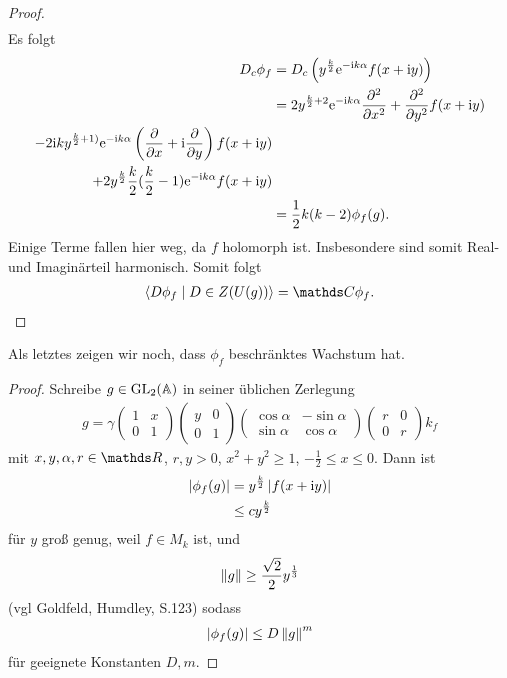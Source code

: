 \begin{proof}
\begin{align*}
\end{align*}
Es folgt
\begin{align*}
D_c \phi_f&=D_c\left(y^{\frac{k}{2}} \mathrm{e}^{-\mathrm{i}k\alpha} f(x+\mathrm{i}y)\right)\\
&=2y^{\frac{k}{2}+2} \mathrm{e}^{-\mathrm{i}k\alpha} \frac{\partial^2}{\partial x^2}+ \frac{\partial^2}{\partial y^2} f(x+\mathrm{i}y)\\
-2\mathrm{i}k y^{\frac{k}{2}+1)} \mathrm{e}^{-\mathrm{i}k\alpha} \left(\frac{\partial}{\partial x}+\mathrm{i}\frac{\partial}{\partial y}\right) f(x+\mathrm{i}y)\\
+2y^{\frac{k}{2}} \frac{k}{2}(\frac{k}{2}-1)\mathrm{e}^{-\mathrm{i}k\alpha} f(x+\mathrm{i}y)\\
&=\frac{1}{2}k(k-2) \phi_f(g).
\end{align*}
Einige Terme fallen hier weg, da $f$ holomorph ist. Insbesondere sind somit Real- und Imaginärteil harmonisch.
Somit folgt
\begin{align*}
\langle D\phi_f \mid D\in Z(U(g))\rangle=\C \phi_f. \qedhere
\end{align*}
\end{proof}

\begin{prop}
Als letztes zeigen wir noch, dass $\phi_f$ beschränktes Wachstum hat.
\end{prop}
\begin{proof}
Schreibe $g\in \operatorname{GL}_2(\mathbb{A})$ in seiner üblichen Zerlegung
\begin{align*}
g=\gamma \begin{pmatrix}
1 &x\\
0 &1
\end{pmatrix}
\begin{pmatrix}
y &0\\
0 &1
\end{pmatrix}
\begin{pmatrix}
\cos \alpha &-\sin \alpha\\
\sin \alpha &\cos \alpha
\end{pmatrix}
\begin{pmatrix}
r &0\\
0 &r
\end{pmatrix}
k_f
\end{align*}
mit $x,y,\alpha,r \in \R$, $r,y>0$, $x^2+y^2\geq 1$, $-\frac{1}{2} \leq x \leq 0$.
Dann ist
\begin{align*}
\left\vert\phi_f(g)\right\vert&=y^{\frac{k}{2}} \left\vert f(x+\mathrm{i}y)\right\vert\\
&\leq cy^{\frac{k}{2}}
\end{align*}
für $y$ groß genug, weil $f \in M_k$ ist, und
\begin{align*}
\left\lVert g\right\rVert \geq \frac{\sqrt{2}}{2}y^{\frac{1}{3}}
\end{align*}
(vgl Goldfeld, Humdley, S.123) sodass
\begin{align*}
\left\vert\phi_f(g)\right\vert \leq D \left\lVert g\right\rVert^m
\end{align*}
für geeignete Konstanten $D,m$.
\end{proof}

